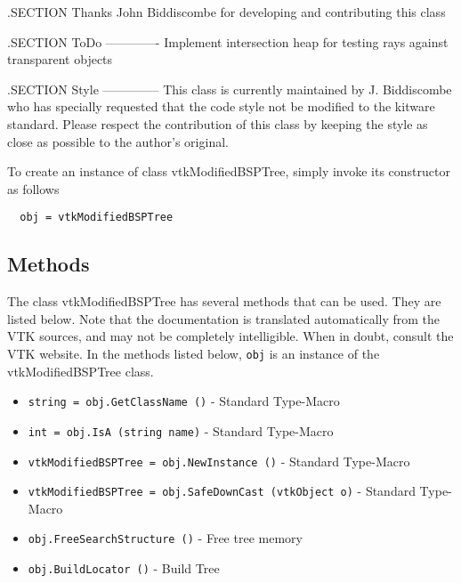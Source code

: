  .SECTION Thanks
  John Biddiscombe for developing and contributing this class

 .SECTION ToDo
 -------------
 Implement intersection heap for testing rays against transparent objects

 .SECTION Style
 --------------
 This class is currently maintained by J. Biddiscombe who has specially
 requested that the code style not be modified to the kitware standard.
 Please respect the contribution of this class by keeping the style
 as close as possible to the author's original.


To create an instance of class vtkModifiedBSPTree, simply
invoke its constructor as follows
\begin{verbatim}
  obj = vtkModifiedBSPTree
\end{verbatim}
\subsection{Methods}

The class vtkModifiedBSPTree has several methods that can be used.
  They are listed below.
Note that the documentation is translated automatically from the VTK sources,
and may not be completely intelligible.  When in doubt, consult the VTK website.
In the methods listed below, \verb|obj| is an instance of the vtkModifiedBSPTree class.
\begin{itemize}
\item  \verb|string = obj.GetClassName ()| -  Standard Type-Macro

\item  \verb|int = obj.IsA (string name)| -  Standard Type-Macro

\item  \verb|vtkModifiedBSPTree = obj.NewInstance ()| -  Standard Type-Macro

\item  \verb|vtkModifiedBSPTree = obj.SafeDownCast (vtkObject o)| -  Standard Type-Macro

\item  \verb|obj.FreeSearchStructure ()| -  Free tree memory

\item  \verb|obj.BuildLocator ()| -  Build Tree

\end{itemize}
